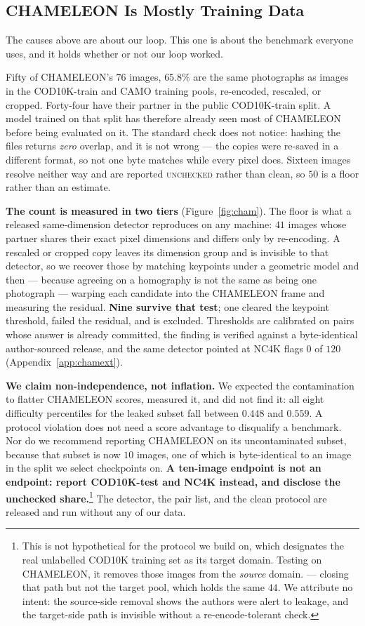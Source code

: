 \documentclass{article}
\begin{document}
\subsection{CHAMELEON Is Mostly Training Data}
\label{sec:contamination}
The causes above are about our loop. This one is about the benchmark everyone uses, and it holds
whether or not our loop worked.

Fifty of CHAMELEON's $76$ images, $65.8\%$ are the same photographs as images in the
COD10K-train and CAMO training pools, re-encoded, rescaled, or cropped. Forty-four have their
partner in the public COD10K-train split. A model trained on that split has therefore already seen
most of CHAMELEON before being evaluated on it. The standard check does not notice: hashing the
files returns \emph{zero} overlap, and it is not wrong --- the copies were re-saved in a different
format, so not one byte matches while every pixel does. Sixteen images resolve neither way and are
reported \textsc{unchecked} rather than clean, so $50$ is a floor rather than an estimate.

\textbf{The count is measured in two tiers} (Figure~\ref{fig:cham}). The floor is what a released
same-dimension detector reproduces on any machine: $41$ images whose partner shares their exact
pixel dimensions and differs only by re-encoding. A rescaled or cropped copy leaves its dimension
group and is invisible to that detector, so we recover those by matching keypoints under a geometric
model and then --- because agreeing on a homography is not the same as being one photograph ---
warping each candidate into the CHAMELEON frame and measuring the residual. \textbf{Nine survive
that test}; one cleared the keypoint threshold, failed the residual, and is excluded. Thresholds are
calibrated on pairs whose answer is already committed, the finding is verified against a
byte-identical author-sourced release, and the same detector pointed at NC4K flags $0$ of $120$
(Appendix~\ref{app:chamext}).

\textbf{We claim non-independence, not inflation.} We expected the contamination to flatter
CHAMELEON scores, measured it, and did not find it: all eight difficulty percentiles for the leaked
subset fall between $0.448$ and $0.559$. A protocol violation does not need a score advantage to
disqualify a benchmark. Nor do we recommend reporting CHAMELEON on its uncontaminated subset,
because that subset is now $10$ images, one of which is byte-identical to an
image in the split we select checkpoints on. \textbf{A ten-image endpoint is not an endpoint:
report COD10K-test and NC4K instead, and disclose the unchecked share.}\footnote{This is not
hypothetical for the protocol we build on, which designates the real unlabelled COD10K training set
as its target domain. Testing on CHAMELEON, it removes those images from the \emph{source} domain.
--- closing that path but not the target pool, which holds the same $44$. We attribute no intent: the source-side removal shows the authors were alert to leakage, and the target-side path is
invisible without a re-encode-tolerant check.} The detector, the pair list, and the clean protocol
are released and run without any of our data.
\end{document}
